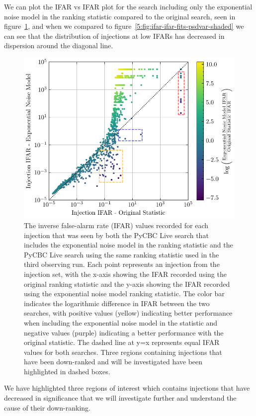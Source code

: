 We can plot the IFAR vs IFAR plot for the search including only the exponential noise model in the ranking statistic compared to the original search, seen in figure~\ref{5:fig:ifar-ifar-fits-only-regions}, and when we compared to figure~\ref{5:fig:ifar-ifar-fits-psdvar-shaded} we can see that the distribution of injections at low IFARs has decreased in dispersion around the diagonal line.
% 
\begin{figure}
       \centering
    \includegraphics[width=1.0\textwidth]{images/5_pycbclive/fits-only/fits_only_ifar_vs_ifar_regions.pdf}
    \caption{The inverse false-alarm rate (IFAR) values recorded for each injection that was seen by both the PyCBC Live search that includes the exponential noise model in the ranking statistic and the PyCBC Live search using the same ranking statistic used in the third observing run. Each point represents an injection from the injection set, with the x-axis showing the IFAR recorded using the original ranking statistic and the y-axis showing the IFAR recorded using the exponential noise model ranking statistic. The color bar indicates the logarithmic difference in IFAR between the two searches, with positive values (yellow) indicating better performance when including the exponential noise model in the statistic and negative values (purple) indicating a better performance with the original statistic. The dashed line at y=x represents equal IFAR values for both searches. Three regions containing injections that have been down-ranked and will be investigated have been highlighted in dashed boxes.}
    \label{5:fig:ifar-ifar-fits-only-regions}
\end{figure}
%
We have highlighted three regions of interest which contains injections that have decreased in significance that we will investigate further and understand the cause of their down-ranking.

